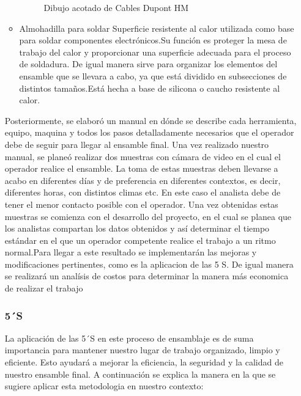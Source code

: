 \begin{itemize}
\begin{itemize}
\begin{figure}[H]
        \caption{Dibujo acotado de Cables Dupont HM}
        \label{fig:enter-label}
    \end{figure}

    \item Almohadilla para soldar
    Superficie resistente al calor utilizada como base para soldar componentes electrónicos.Su función es proteger la mesa de trabajo del calor y proporcionar una superficie adecuada para el proceso de soldadura. De igual manera sirve para organizar los elementos del ensamble que se llevara a cabo, ya que está dividido en subsecciones de distintos tamaños.Está hecha a base de silicona o caucho resistente al calor.
\end{itemize}
    
    
     Posteriormente, se elaboró un manual en dónde se describe cada herramienta, equipo, maquina y todos los pasos detalladamente necesarios que el operador debe de seguir para llegar al ensamble final.
     Una vez realizado nuestro manual, se planeó realizar dos muestras con cámara de video en el cual el operador realice el ensamble. La toma de estas muestras deben llevarse a acabo en diferentes días y de preferencia en diferentes contextos, es decir, diferentes horas, con distintos climas etc. En este caso el analista debe de tener el menor contacto posible con el operador.
     Una vez obtenidas estas muestras se comienza con el desarrollo del proyecto, en el cual se planea que los analistas compartan los datos obtenidos y así determinar el tiempo estándar en el que un operador competente realice el trabajo a un ritmo normal.Para llegar a este resultado se  implementarán las mejoras y modificaciones pertinentes, como es la aplicacion de las 5 S. De igual manera se realizará un analísis de costos para determinar la manera más economica de realizar el trabajo
    \subsubsection{5´S}
    La aplicación de las 5´S en este proceso de ensamblaje es de suma importancia para mantener nuestro lugar de trabajo organizado, limpio y eficiente. Esto ayudará a mejorar la eficiencia, la seguridad y la calidad de nuestro ensamble final. A continuación se explica la manera en la que se sugiere aplicar esta metodologia en nuestro contexto:
    

\end{itemize}
